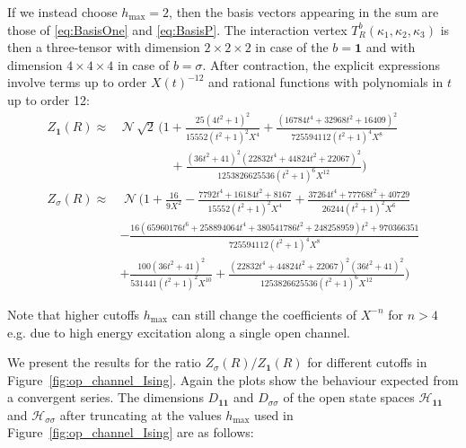 \documentclass[11pt,a4paper]{article}
\numberwithin{equation}{section}
\newcommand{\one}{\mathbf{1}} %
\begin{document}
If we instead choose $h_\mathrm{max} = 2$, then the basis vectors appearing in the sum are those of \eqref{eq:BasisOne} and \eqref{eq:BasisP}. The interaction vertex
$T_R^b(\kappa_1,\kappa_2,\kappa_3)$ is then a three-tensor with dimension $2\times2\times2$ in case of the $b=\one$ and with dimension $4\times4\times4$ in case of $b=\sigma$.
After contraction, the explicit expressions involve terms up to order $X(t)^{-12}$ and rational functions with polynomials in $t$ up to order 12: 
%
\begin{align}
    Z_{\one}(R) \approx& 
    \,\mathcal{N} \,\sqrt{2}\, 
    \Bigg(1 + 
    \frac{25 \left(4 t^2+1\right)^2}{15552 \left(t^2+1\right)^2 X^4}
    +\frac{\left(16784 t^4+32968 t^2+16409\right)^2}{725594112
   \left(t^2+1\right)^4 X^8}\nonumber\\
   &\hspace{4em}
   +\frac{\left(36
   t^2+41\right)^2 \left(22832 t^4+44824 t^2+22067\right)^2}{1253826625536
   \left(t^2+1\right)^6 X^{12}}\Bigg) 
   \nonumber \\
    Z_{\sigma}(R) \approx&\, 
        \,\mathcal{N}\,
    \Bigg(1
    +\frac{16}{9 X^2}
    -\frac{7792 t^4+16184 t^2+8167}{15552 \left(t^2+1\right)^2 X^4}
    +\frac{37264 t^4+77768 t^2+40729}{26244 \left(t^2+1\right)^2X^6}\nonumber\\
    &-\frac{16\left(65960176 t^6+258894064 t^4+380541786 t^2+248258959\right) t^2+970366351}{725594112\left(t^2+1\right)^4 X^8}\nonumber\\
    &+\frac{100 \left(36 t^2+41\right)^2}{531441 \left(t^2+1\right)^2 X^{10}}+\frac{\left(22832 t^4+44824 t^2+22067\right)^2 \left(36 t^2+41\right)^2}{1253826625536
   \left(t^2+1\right)^6 X^{12}}\Bigg)
\end{align}

\noindent
Note that higher cutoffs $h_\mathrm{max}$ can still change the coefficients of $X^{-n}$ for $n>4$ e.g. due to high energy excitation along a single open channel. 

We present the results for the ratio $Z_\sigma(R)/Z_\one(R)$ for different cutoffs in Figure~\ref{fig:op_channel_Ising}. Again the plots show the behaviour expected from a convergent series. 
The dimensions $D_{\one\one}$ and $D_{\sigma\sigma}$ of the open state spaces $\mathcal{H}_{\one\one}$ and $\mathcal{H}_{\sigma\sigma}$ after truncating at the values $h_\mathrm{max}$ used in Figure~\ref{fig:op_channel_Ising} are as follows:

%
\end{document}
